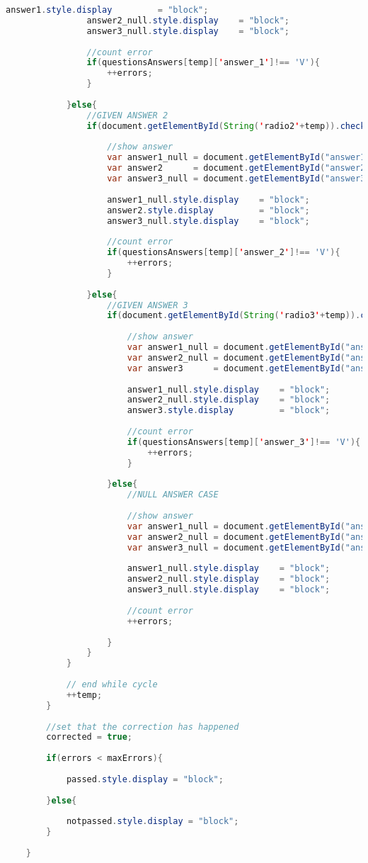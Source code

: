 \begin{lstlisting}[language=java]
				answer1.style.display         = "block";
				answer2_null.style.display    = "block";
				answer3_null.style.display    = "block";
				
				//count error
				if(questionsAnswers[temp]['answer_1']!== 'V'){
					++errors;
				}
				
			}else{
				//GIVEN ANSWER 2
				if(document.getElementById(String('radio2'+temp)).checked){
					
					//show answer
					var answer1_null = document.getElementById("answer1_null"+temp);
					var answer2      = document.getElementById("answer2"+temp);
					var answer3_null = document.getElementById("answer3_null"+temp);
					
					answer1_null.style.display    = "block";
					answer2.style.display         = "block";
					answer3_null.style.display    = "block";
					
					//count error
					if(questionsAnswers[temp]['answer_2']!== 'V'){
						++errors;
					}
					
				}else{
					//GIVEN ANSWER 3
					if(document.getElementById(String('radio3'+temp)).checked){
						
						//show answer
						var answer1_null = document.getElementById("answer1_null"+temp);
						var answer2_null = document.getElementById("answer2_null"+temp);
						var answer3      = document.getElementById("answer3"+temp);
						
						answer1_null.style.display    = "block";
						answer2_null.style.display    = "block";
						answer3.style.display         = "block";
						
						//count error
						if(questionsAnswers[temp]['answer_3']!== 'V'){
							++errors;
						}
						
					}else{
						//NULL ANSWER CASE
						
						//show answer
						var answer1_null = document.getElementById("answer1_null"+temp);
						var answer2_null = document.getElementById("answer2_null"+temp);
						var answer3_null = document.getElementById("answer3_null"+temp);
						
						answer1_null.style.display    = "block";
						answer2_null.style.display    = "block";
						answer3_null.style.display    = "block";
						
						//count error
						++errors;
						
					}
				}
			}
			
			// end while cycle
			++temp;
		}
		
		//set that the correction has happened
		corrected = true;
		
		if(errors < maxErrors){
			
			passed.style.display = "block";
			
		}else{
			
			notpassed.style.display = "block";
		}
		
	}
\end{lstlisting}\leavevmode\\

